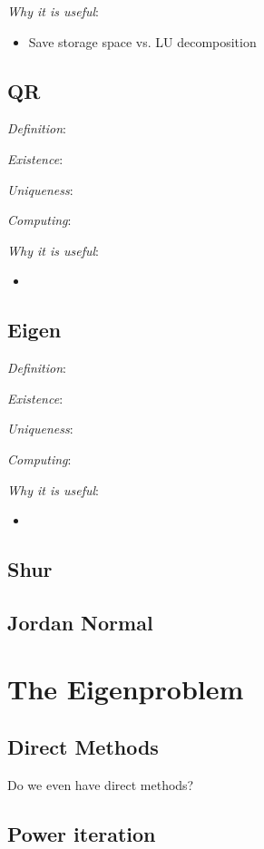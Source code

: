 \documentclass[12pt]{article}
\begin{document}
\textit{Why it is useful}:
\begin{itemize}[nolistsep]
    \item Save storage space vs. LU decomposition
\end{itemize}

\subsection{QR}
\textit{Definition}:

\textit{Existence}:

\textit{Uniqueness}:

\textit{Computing}:

\textit{Why it is useful}:
\begin{itemize}[nolistsep]
    \item 
\end{itemize}



\subsection{Eigen}
\textit{Definition}:

\textit{Existence}:

\textit{Uniqueness}:

\textit{Computing}:

\textit{Why it is useful}:
\begin{itemize}[nolistsep]
    \item 
\end{itemize}

\subsection{Shur}

\subsection{Jordan Normal}

\pagebreak
\section{The Eigenproblem}
\subsection{Direct Methods}
Do we even have direct methods?

\subsection{Power iteration}
\end{document}
